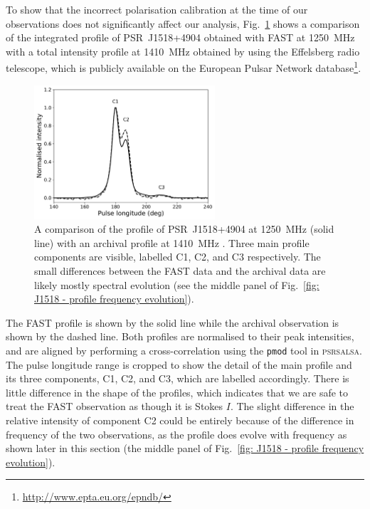To show that the incorrect polarisation calibration at the time of our observations does not significantly affect our analysis, Fig.~\ref{fig: J1518 - profile comparison} shows a comparison of the integrated profile of PSR~J1518+4904 obtained with FAST at 1250~MHz with a total intensity profile at 1410~MHz obtained by \citet{KXL+1998} using the Effelsberg radio telescope, which is publicly available on the European Pulsar Network database\footnote{\url{http://www.epta.eu.org/epndb/}}.
\begin{figure}
    \begin{center}
        \includegraphics[width=0.6\textwidth]{Figures/J1518/profile_comparison}
        \caption[Profile comparison]{A comparison of the profile of PSR~J1518+4904 at 1250~MHz (solid line) with an archival profile at 1410~MHz \citep[dashed line,][]{KXL+1998}. Three main profile components are visible, labelled C1, C2, and C3 respectively. The small differences between the FAST data and the archival data are likely mostly spectral evolution (see the middle panel of Fig.~\ref{fig: J1518 - profile frequency evolution}).}
        \label{fig: J1518 - profile comparison}
    \end{center}
\end{figure}
The FAST profile is shown by the solid line while the archival observation is shown by the dashed line. Both profiles are normalised to their peak intensities, and are aligned by performing a cross-correlation using the \texttt{pmod} tool in \textsc{psrsalsa}. The pulse longitude range is cropped to show the detail of the main profile and its three components, C1, C2, and C3, which are labelled accordingly. There is little difference in the shape of the profiles, which indicates that we are safe to treat the FAST observation as though it is Stokes $I$. The slight difference in the relative intensity of component C2 could be entirely because of the difference in frequency of the two observations, as the profile does evolve with frequency as shown later in this section (the middle panel of Fig.~\ref{fig: J1518 - profile frequency evolution}).

